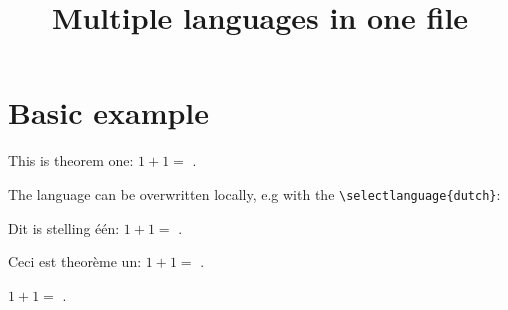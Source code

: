 \documentclass{ximera}
\title{Multiple languages in one file}
\begin{document}
\begin{abstract}%
\end{abstract}
\maketitle

\section*{Basic example}%

        \begin{theorem}
            This is theorem one: $1+1 = $ .
        \end{theorem}


        The language can be overwritten locally, e.g with the \verb|\selectlanguage{dutch}|:
        \begin{theorem}
            Dit is stelling één: $1+1 = $ .
        \end{theorem}

        \begin{theorem}
            Ceci est theorème un: $1+1 = $ .
        \end{theorem}

        \begin{theorem}
            $1+1 = $ .
        \end{theorem}
\end{document}
